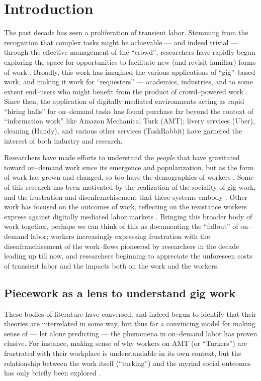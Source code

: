 \documentclass[trackingWork]{subfiles}
\begin{document}
\section{Introduction}
\onlyinsubfile{}
The past decade has seen a proliferation of transient labor.
Stemming from the recognition that
complex tasks might be achievable
--- and indeed trivial ---
through the effective management of the ``crowd'',
researchers have rapidly begun exploring
the space for opportunities to facilitate new (and revisit familiar) forms of work
\cite{bernsteinSoylent,redballoon}.
Broadly, this work has imagined the various applications of ``gig''--based work,
and making it work for ``requesters''
--- academics, industries, and to some extent end--users
who might benefit from the product of crowd--powered work
\cite{hong2015group,jonBrelig,paolacci2010running}.
Since then,
the application of digitally mediated environments acting as rapid ``hiring halls''
for on--demand tasks
has found purchase far beyond the context of ``information work'' like Amazon Mechanical Turk (AMT);
livery services (Uber), cleaning (Handy), and various other services (TaskRabbit)
have garnered the interest of both industry and research.

Researchers have made efforts to understand the \textit{people} that have gravitated toward on--demand work
since its emergence and popularization,
but as the form of work has grown and changed, so too have the demographics of workers
\cite{Ross,whoareNOTtheTurkers}.
Some of this research has been motivated by the realization of the sociality of gig work,
and the frustration and disenfranchisement that these systems embody
\cite{turkopticon,dynamo}.
Other work has focused on the outcomes of work,
reflecting on the resistance workers express against digitally mediated labor markets
\cite{uberAlgorithm}.
Bringing this broader body of work together, perhaps we can think of this as documenting the ``fallout'' of on--demand labor;
workers increasingly expressing frustration with the disenfranchisement of the work--flows pioneered by researchers in the decade leading up till now,
and researchers beginning to appreciate the unforeseen costs of transient labor and the impacts both on the work and the workers.

\subsection{Piecework as a lens to understand gig work}
These bodies of literature have conversed,
and indeed begun to identify that their theories are interrelated in some way,
but thus far a convincing model for making sense of
--- let alone predicting ---
the phenomena in on--demand labor has proven elusive.
For instance, 
making sense of why workers on AMT (or ``Turkers'') are frustrated with their workplace
is understandable in its own context, but
the relationship between the work itself (``turking'')
and the myriad social outcomes has only briefly been explored
\cite{crowdcollab}.
\end{document}
